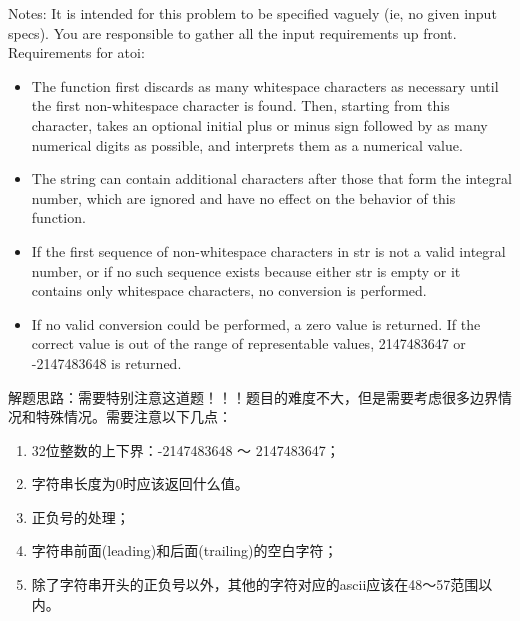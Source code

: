 \documentclass[a4paper,10pt]{article}
\begin{document}
\noindent Notes: It is intended for this problem to be specified vaguely (ie, no given input specs). You are responsible to gather all the input requirements up front. \\

\noindent Requirements for atoi:
\begin{itemize}
    \item The function first discards as many whitespace characters as necessary until the first non-whitespace character is found. Then, starting from this character, takes an optional initial plus or minus sign followed by as many numerical digits as possible, and interprets them as a numerical value.
    \item The string can contain additional characters after those that form the integral number, which are ignored and have no effect on the behavior of this function.
    \item If the first sequence of non-whitespace characters in str is not a valid integral number, or if no such sequence exists because either str is empty or it contains only whitespace characters, no conversion is performed.
    \item If no valid conversion could be performed, a zero value is returned. If the correct value is out of the range of representable values, 2147483647 or -2147483648 is returned.
\end{itemize}

\begin{CJK*}{UTF8}{gbsn}
\noindent 解题思路：需要特别注意这道题！！！题目的难度不大，但是需要考虑很多边界情况和特殊情况。需要注意以下几点：
\begin{enumerate}
    \item 32位整数的上下界：-2147483648 ～ 2147483647；
    \item 字符串长度为0时应该返回什么值。
    \item 正负号的处理；
    \item 字符串前面(leading)和后面(trailing)的空白字符；
    \item 除了字符串开头的正负号以外，其他的字符对应的ascii应该在48～57范围以内。
\end{enumerate}
\end{CJK*}
\end{document}
